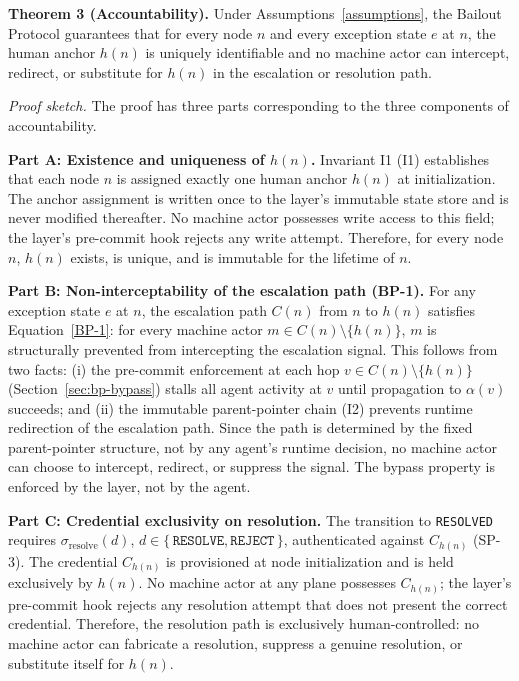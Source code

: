 \begin{tcolorbox}[colback=gray!5, colframe=gray!50, width=4.8in, before=\centering, after=\centering]
\begin{minipage}{4.6in}
\textbf{Theorem 3 (Accountability).} Under Assumptions~\ref{assumptions}, the Bailout Protocol guarantees that for every node $n$ and every exception state $e$ at $n$, the human anchor $h(n)$ is uniquely identifiable and no machine actor can intercept, redirect, or substitute for $h(n)$ in the escalation or resolution path.
\end{minipage}
\end{tcolorbox}

\medskip
\textit{Proof sketch.} The proof has three parts corresponding to the three components of accountability.

\textbf{Part A: Existence and uniqueness of $h(n)$.} Invariant I1 (I1) establishes that each node $n$ is assigned exactly one human anchor $h(n)$ at initialization. The anchor assignment is written once to the \fact{} layer's immutable state store and is never modified thereafter. No machine actor possesses write access to this field; the \fact{} layer's pre-commit hook rejects any write attempt. Therefore, for every node $n$, $h(n)$ exists, is unique, and is immutable for the lifetime of $n$.

\textbf{Part B: Non-interceptability of the escalation path (BP-1).} For any exception state $e$ at $n$, the escalation path $C(n)$ from $n$ to $h(n)$ satisfies Equation~\ref{BP-1}: for every machine actor $m \in C(n) \setminus \{h(n)\}$, $m$ is structurally prevented from intercepting the escalation signal. This follows from two facts: (i) the pre-commit enforcement at each hop $v \in C(n) \setminus \{h(n)\}$ (Section~\ref{sec:bp-bypass}) stalls all agent activity at $v$ until propagation to $\alpha(v)$ succeeds; and (ii) the immutable parent-pointer chain (I2) prevents runtime redirection of the escalation path. Since the path is determined by the fixed parent-pointer structure, not by any agent's runtime decision, no machine actor can choose to intercept, redirect, or suppress the signal. The bypass property is enforced by the \fact{} layer, not by the agent.

\textbf{Part C: Credential exclusivity on resolution.} The transition to \texttt{RESOLVED} requires $\sigma_{\text{resolve}}(d)$, $d \in \{\,\texttt{RESOLVE}, \texttt{REJECT}\,\}$, authenticated against $C_{h(n)}$ (SP-3). The credential $C_{h(n)}$ is provisioned at node initialization and is held exclusively by $h(n)$. No machine actor at any plane possesses $C_{h(n)}$; the \fact{} layer's pre-commit hook rejects any resolution attempt that does not present the correct credential. Therefore, the resolution path is exclusively human-controlled: no machine actor can fabricate a resolution, suppress a genuine resolution, or substitute itself for $h(n)$.

